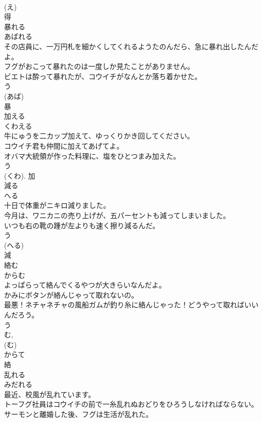 \documentclass[8pt]{extreport}
\begin{document}
\begin{CJK}{UTF8}{min}
\\	(え) 
\\	得	
\\	暴れる	
\\	あばれる	
\\	その店員に、一万円札を細かくしてくれるようたのんだら、急に暴れ出したんだよ。	
\\	フグがおこって暴れたのは一度しか見たことがありません。	
\\	ビエトは酔って暴れたが、コウイチがなんとか落ち着かせた。	
\\	う 
\\	(あば) 
\\	暴	
\\	加える	
\\	くわえる	
\\	牛にゅうを二カップ加えて、ゆっくりかき回してください。	
\\	コウイチ君も仲間に加えてあげてよ。	
\\	オバマ大統領が作った料理に、塩をひとつまみ加えた。	
\\	う 
\\	(くわ).	加	
\\	減る	
\\	へる	
\\	十日で体重がニキロ減りました。	
\\	今月は、ワニカニの売り上げが、五パーセントも減ってしまいました。	
\\	いつも右の靴の踵が左よりも速く擦り減るんだ。	
\\	う 
\\	(へる) 
\\	減	
\\	絡む	
\\	からむ	
\\	よっぱらって絡んでくるやつが大きらいなんだよ。	
\\	かみにボタンが絡んじゃって取れないの。	
\\	最悪！ネチャネチャの風船ガムが釣り糸に絡んじゃった！どうやって取ればいいんだろう。	
\\	う 
\\	む, 
\\	(む) 
\\	からて 
\\	絡	
\\	乱れる	
\\	みだれる	
\\	最近、校風が乱れています。	
\\	トーフグ社員はコウイチの前で一糸乱れぬおどりをひろうしなければならない。	
\\	サーモンと離婚した後、フグは生活が乱れた。	

\end{CJK}
\end{document}
